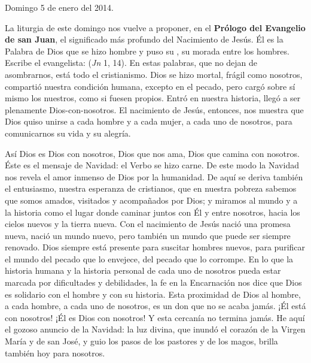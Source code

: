 Domingo 5 de enero del 2014.

La liturgia de este domingo nos vuelve a proponer, en el \textbf{Prólogo del Evangelio de san Juan}, el significado más profundo del Nacimiento de Jesús. Él es la Palabra de Dios que se hizo hombre y puso su , su morada entre los hombres. Escribe el evangelista:  (\emph{Jn} 1, 14). En estas palabras, que no dejan de asombrarnos, está todo el cristianismo. Dios se hizo mortal, frágil como nosotros, compartió nuestra condición humana, excepto en el pecado, pero cargó sobre sí mismo los nuestros, como si fuesen propios. Entró en nuestra historia, llegó a ser plenamente Dios-con-nosotros. El nacimiento de Jesús, entonces, nos muestra que Dios quiso unirse a cada hombre y a cada mujer, a cada uno de nosotros, para comunicarnos su vida y su alegría.

Así Dios es Dios con nosotros, Dios que nos ama, Dios que camina con nosotros. Éste es el mensaje de Navidad: el Verbo se hizo carne. De este modo la Navidad nos revela el amor inmenso de Dios por la humanidad. De aquí se deriva también el entusiasmo, nuestra esperanza de cristianos, que en nuestra pobreza sabemos que somos amados, visitados y acompañados por Dios; y miramos al mundo y a la historia como el lugar donde caminar juntos con Él y entre nosotros, hacia los cielos nuevos y la tierra nueva. Con el nacimiento de Jesús nació una promesa nueva, nació un mundo nuevo, pero también un mundo que puede ser siempre renovado. Dios siempre está presente para suscitar hombres nuevos, para purificar el mundo del pecado que lo envejece, del pecado que lo corrompe. En lo que la historia humana y la historia personal de cada uno de nosotros pueda estar marcada por dificultades y debilidades, la fe en la Encarnación nos dice que Dios es solidario con el hombre y con su historia. Esta proximidad de Dios al hombre, a cada hombre, a cada uno de nosotros, es un don que no se acaba jamás. ¡Él está con nosotros! ¡Él es Dios con nosotros! Y esta cercanía no termina jamás. He aquí el gozoso anuncio de la Navidad: la luz divina, que inundó el corazón de la Virgen María y de san José, y guio los pasos de los pastores y de los magos, brilla también hoy para nosotros.

